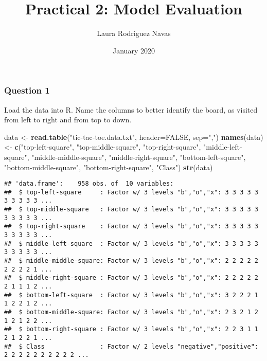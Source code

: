 \documentclass[]{article}
\title{Practical 2: Model Evaluation}
\author{Laura Rodriguez Navas}
\date{January 2020}
\newenvironment{Shaded}{\begin{snugshade}}{\end{snugshade}}
\newcommand{\DataTypeTok}[1]{\textcolor[rgb]{0.13,0.29,0.53}{#1}}
\newcommand{\KeywordTok}[1]{\textcolor[rgb]{0.13,0.29,0.53}{\textbf{#1}}}
\newcommand{\NormalTok}[1]{#1}
\newcommand{\OtherTok}[1]{\textcolor[rgb]{0.56,0.35,0.01}{#1}}
\newcommand{\StringTok}[1]{\textcolor[rgb]{0.31,0.60,0.02}{#1}}
\begin{document}
\maketitle

\hypertarget{question-1}{%
\subsubsection{Question 1}\label{question-1}}

Load the data into R. Name the columns to better identify the board, as
visited from left to right and from top to down.

\begin{Shaded}
\begin{Highlighting}[]
\NormalTok{data <-}\StringTok{ }\KeywordTok{read.table}\NormalTok{(}\StringTok{"tic-tac-toe.data.txt"}\NormalTok{, }\DataTypeTok{header=}\OtherTok{FALSE}\NormalTok{, }\DataTypeTok{sep=}\StringTok{","}\NormalTok{)}
\KeywordTok{names}\NormalTok{(data) <-}\StringTok{ }\KeywordTok{c}\NormalTok{(}\StringTok{"top-left-square"}\NormalTok{, }
                 \StringTok{"top-middle-square"}\NormalTok{, }
                 \StringTok{"top-right-square"}\NormalTok{, }
                 \StringTok{"middle-left-square"}\NormalTok{, }
                 \StringTok{"middle-middle-square"}\NormalTok{, }
                 \StringTok{"middle-right-square"}\NormalTok{, }
                 \StringTok{"bottom-left-square"}\NormalTok{, }
                 \StringTok{"bottom-middle-square"}\NormalTok{,}
                 \StringTok{"bottom-right-square"}\NormalTok{, }
                 \StringTok{"Class"}\NormalTok{)}
\KeywordTok{str}\NormalTok{(data)}
\end{Highlighting}
\end{Shaded}

\begin{verbatim}
## 'data.frame':    958 obs. of  10 variables:
##  $ top-left-square     : Factor w/ 3 levels "b","o","x": 3 3 3 3 3 3 3 3 3 3 ...
##  $ top-middle-square   : Factor w/ 3 levels "b","o","x": 3 3 3 3 3 3 3 3 3 3 ...
##  $ top-right-square    : Factor w/ 3 levels "b","o","x": 3 3 3 3 3 3 3 3 3 3 ...
##  $ middle-left-square  : Factor w/ 3 levels "b","o","x": 3 3 3 3 3 3 3 3 3 3 ...
##  $ middle-middle-square: Factor w/ 3 levels "b","o","x": 2 2 2 2 2 2 2 2 2 1 ...
##  $ middle-right-square : Factor w/ 3 levels "b","o","x": 2 2 2 2 2 2 1 1 1 2 ...
##  $ bottom-left-square  : Factor w/ 3 levels "b","o","x": 3 2 2 2 1 1 2 2 1 2 ...
##  $ bottom-middle-square: Factor w/ 3 levels "b","o","x": 2 3 2 1 2 1 2 1 2 2 ...
##  $ bottom-right-square : Factor w/ 3 levels "b","o","x": 2 2 3 1 1 2 1 2 2 1 ...
##  $ Class               : Factor w/ 2 levels "negative","positive": 2 2 2 2 2 2 2 2 2 2 ...
\end{verbatim}
\end{document}
